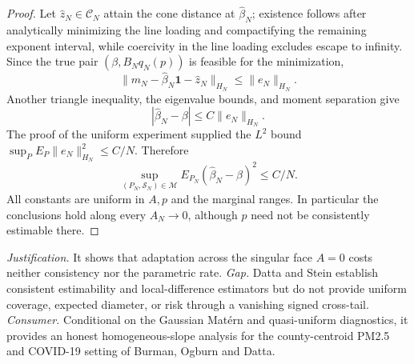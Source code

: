 \documentclass{article}
\begin{document}
\begin{proof}
Let \(\widehat z_N\in\mathcal C_N\) attain the cone distance at \(\widehat\beta_N\); existence follows after analytically minimizing the line loading and compactifying the remaining exponent interval, while coercivity in the line loading excludes escape to infinity.  Since the true pair \((\beta,B_Nq_N(p))\) is feasible for the minimization,
\[
 \|m_N-\widehat\beta_N\mathbf1-\widehat z_N\|_{H_N}
 \le \|e_N\|_{H_N}.
\]
Another triangle inequality, the eigenvalue bounds, and moment separation give
\[
 |\widehat\beta_N-\beta|
 \le C\|e_N\|_{H_N}.
\]
The proof of the uniform experiment supplied the \(L^2\) bound
\(\sup_P E_P\|e_N\|_{H_N}^2\le C/N\).  Therefore
\[
 \sup_{(P_N,\mathcal S_N)\in\mathcal M}
 E_{P_N}(\widehat\beta_N-\beta)^2\le C/N.
\]
All constants are uniform in \(A,p\) and the marginal ranges.  In particular the conclusions hold along every \(A_N\to0\), although \(p\) need not be consistently estimable there.
\end{proof}
\par\smallskip\noindent \textit{Justification.} It shows that adaptation across the singular face \(A=0\) costs neither consistency nor the parametric rate. \textit{Gap.} Datta and Stein establish consistent estimability and local-difference estimators but do not provide uniform coverage, expected diameter, or risk through a vanishing signed cross-tail. \textit{Consumer.} Conditional on the Gaussian Mat\'ern and quasi-uniform diagnostics, it provides an honest homogeneous-slope analysis for the county-centroid PM2.5 and COVID-19 setting of Burman, Ogburn and Datta.
\end{document}
